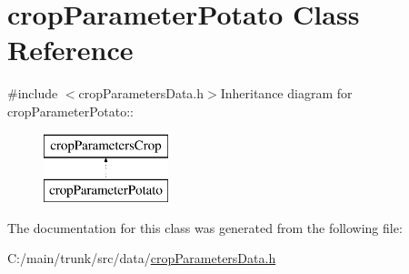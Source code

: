 \hypertarget{classcrop_parameter_potato}{
\section{cropParameterPotato Class Reference}
\label{classcrop_parameter_potato}
}


{\ttfamily \#include $<$cropParametersData.h$>$}Inheritance diagram for cropParameterPotato::\begin{figure}[H]
\begin{center}
\leavevmode
\includegraphics[height=2cm]{classcrop_parameter_potato}
\end{center}
\end{figure}


The documentation for this class was generated from the following file:\begin{DoxyCompactItemize}
\item 
C:/main/trunk/src/data/\hyperlink{crop_parameters_data_8h}{cropParametersData.h}\end{DoxyCompactItemize}
